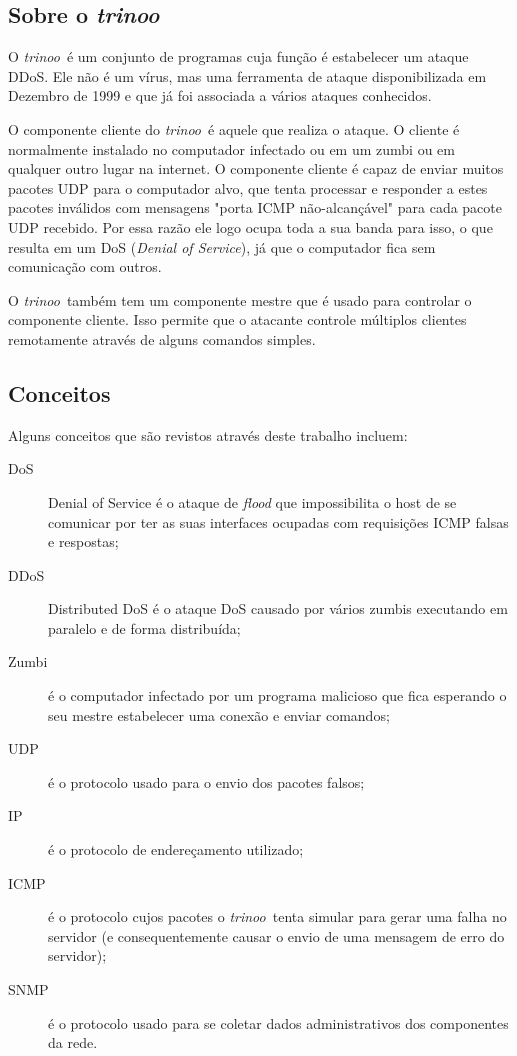 \documentclass[10pt,a4paper]{article}
\newcommand{\trinoo}{\textit{trinoo}}
\begin{document}
\subsection{Sobre o \trinoo}

O \trinoo\ é um conjunto de programas cuja função é estabelecer um ataque DDoS. Ele não é um
vírus, mas uma ferramenta de ataque disponibilizada em Dezembro de 1999 e que já foi associada a
vários ataques conhecidos.

O componente cliente do \trinoo\ é aquele que realiza o ataque. O cliente é normalmente instalado no
computador infectado ou em um zumbi ou em qualquer outro lugar na internet. O componente cliente é
capaz de enviar muitos pacotes UDP para o computador alvo, que tenta processar e responder a estes
pacotes inválidos com mensagens "porta ICMP não-alcançável" para cada pacote UDP recebido. Por essa
razão ele logo ocupa toda a sua banda para isso, o que resulta em um DoS (\emph{Denial of Service}),
já que o computador fica sem comunicação com outros.

O \trinoo\ também tem um componente mestre que é usado para controlar o componente cliente. Isso
permite que o atacante controle múltiplos clientes remotamente através de alguns comandos simples.


\subsection{Conceitos}

Alguns conceitos que são revistos através deste trabalho incluem:

\begin{description}
	\item[DoS] Denial of Service é o ataque de \emph{flood} que impossibilita o host de se
	comunicar por ter as suas interfaces ocupadas com requisições ICMP falsas e respostas;
	\item[DDoS] Distributed DoS é o ataque DoS causado por vários zumbis executando em paralelo
	e de forma distribuída;
	\item[Zumbi] é o computador infectado por um programa malicioso que fica esperando o seu
	mestre estabelecer uma conexão e enviar comandos;
	\item[UDP] é o protocolo usado para o envio dos pacotes falsos;
	\item[IP] é o protocolo de endereçamento utilizado;
	\item[ICMP] é o protocolo cujos pacotes o \trinoo\ tenta simular para gerar uma falha
	no servidor (e consequentemente causar o envio de uma mensagem de erro do servidor);
	\item[SNMP] é o protocolo usado para se coletar dados administrativos dos componentes da
	rede.
\end{description}
\end{document}
